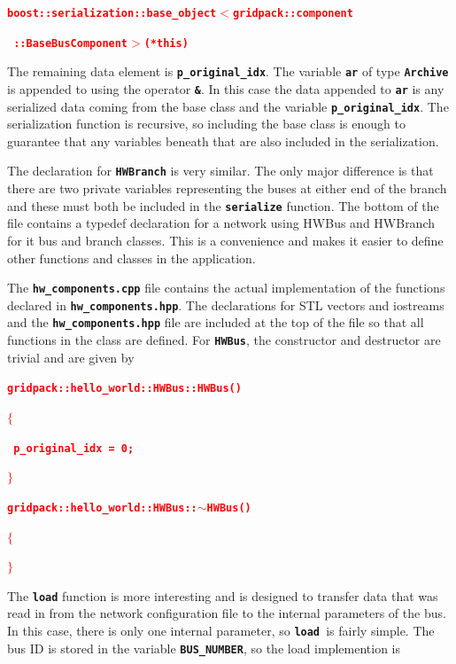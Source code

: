 \documentclass[12pt]{report} %
\begin{document}
\textcolor{red}{\texttt{\textbf{boost::serialization::base\_object$\boldsymbol{\mathrm{<}}$gridpack::component}}}

\textcolor{red}{\texttt{\textbf{     ::BaseBusComponent$\boldsymbol{\mathrm{>}}$(*this)}}}

The remaining data element is \texttt{\textbf{p\_original\_idx}}. The variable \texttt{\textbf{ar}} of type \texttt{\textbf{Archive}} is appended to using the operator \texttt{\textbf{\&}}. In this case the data appended to \texttt{\textbf{ar}} is any serialized data coming from the base class and the variable \texttt{\textbf{p\_original\_idx}}. The serialization function is recursive, so including the base class is enough to guarantee that any variables beneath that are also included in the serialization.

The declaration for \texttt{\textbf{HWBranch}} is very similar. The only major difference is that there are two private variables representing the buses at either end of the branch and these must both be included in the \texttt{\textbf{serialize}} function.
The bottom of the file contains a typedef declaration for a network using HWBus and HWBranch for it bus and branch classes. This is a convenience and makes it easier to define other functions and classes in the application.

The \texttt{\textbf{hw\_components.cpp}} file contains the actual implementation of the functions declared in \texttt{\textbf{hw\_components.hpp}}. The declarations for STL vectors and iostreams and the \texttt{\textbf{hw\_components.hpp}} file are included at the top of the file so that all functions in the class are defined. For \texttt{\textbf{HWBus}}, the constructor and destructor are trivial and are given by

\textcolor{red}{\texttt{\textbf{gridpack::hello\_world::HWBus::HWBus()}}}

\textcolor{red}{\texttt{\textbf{$\boldsymbol{\mathrm{\{}}$}}}

\textcolor{red}{\texttt{\textbf{  p\_original\_idx = 0;}}}

\textcolor{red}{\texttt{\textbf{$\boldsymbol{\mathrm{\}}}$}}}

\textcolor{red}{\texttt{\textbf{gridpack::hello\_world::HWBus::$\boldsymbol{\mathrm{\sim}}$HWBus()}}}

\textcolor{red}{\texttt{\textbf{$\boldsymbol{\mathrm{\{}}$}}}

\textcolor{red}{\texttt{\textbf{$\boldsymbol{\mathrm{\}}}$}}}

The \texttt{\textbf{load}} function is more interesting and is designed to transfer data that was read in from the network configuration file to the internal parameters of the bus. In this case, there is only one internal parameter, so \texttt{\textbf{load }}is fairly simple. The bus ID is stored in the variable \texttt{\textbf{BUS\_NUMBER}}, so the load implemention is
\end{document}
